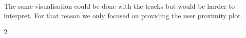 The same visualisation could be done with the tracks but would be harder to interpret. For that reason we only focused  on providing the user proximity plot.

\begin{multicols}{2}
\end{multicols}
